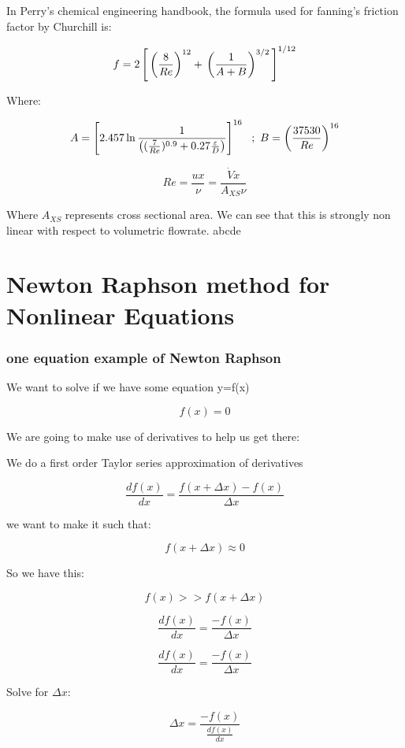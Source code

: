 \documentclass[12pt]{article}
\renewcommand{\_}{\kern-1.5pt\textunderscore\kern-1.5pt}
\begin{document}
In Perry's chemical engineering handbook, the formula used for fanning's friction factor by Churchill is:

$$f = 2 \left[\\
\left( \frac{8}{Re} \right)^{12} + \\
\left( \frac{1}{A+B}\right)^{3/2} \\
\right]^{1/12} $$
 
Where:

$$A = \left[ 2.457 \ln \frac{1}{\left( (\frac{7}{Re})^{0.9} + \\
0.27 \frac{\varepsilon}{D} \right)} \\
\right]^{16}\ \ ; \ \ \\
B = \left( \frac{37530}{Re} \\ 
\right)^{16} $$


$$Re = \frac{ux}{\nu} = \frac{\dot{V} x}{A_{XS} \nu}$$

Where $A_{XS}$ represents cross sectional area.
We can see that this is strongly non linear with respect to volumetric flowrate.
abcde

\part{Newton Raphson method for Nonlinear Equations}

\section{one equation example of Newton Raphson}
We want to solve if we have some equation y=f(x)

$$f(x)=0$$

We are going to make use of derivatives to help us get there:

We do a first order Taylor series approximation of derivatives

$$\frac{d f(x)}{dx} = \frac{f(x + \Delta x) - f(x)}{\Delta x}$$

we want to make it such that:

$$f(x + \Delta x) \approx 0$$

So we have this:

$$f(x) >> f(x+\Delta x)$$

$$\frac{d f(x)}{dx} = \frac{ - f(x)}{\Delta x}$$

$$\frac{d f(x)}{dx} = \frac{ - f(x)}{\Delta x}$$

Solve for $\Delta x$:

$$\Delta x = \frac{ - f(x)}{\frac{d f(x)}{dx}}$$
\end{document}

